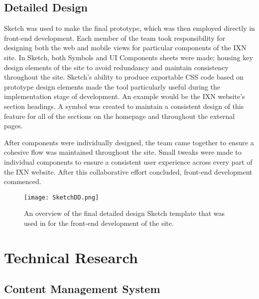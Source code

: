 \documentclass[fontsize=11pt]{extarticle}
\numberwithin{figure}{section} %
\numberwithin{table}{section}%
\begin{document}
\hypertarget{detailed-design}{%
\subsection{Detailed Design}\label{detailed-design}}

Sketch was used to make the final prototype, which was then employed
directly in front-end development. Each member of the team took
responsibility for designing both the web and mobile views for
particular components of the IXN site. In Sketch, both Symbols and UI
Components sheets were made; housing key design elements of the site to
avoid redundancy and maintain consistency throughout the site. Sketch's
ability to produce exportable CSS code based on prototype design
elements made the tool particularly useful during the implementation
stage of development. An example would be the IXN website's section
headings. A symbol was created to maintain a consistent design of this
feature for all of the sections on the homepage and throughout the
external pages.

After components were individually designed, the team came together to
ensure a cohesive flow was maintained throughout the site. Small tweaks
were made to individual components to ensure a consistent user
experience across every part of the IXN website. After this
collaborative effort concluded, front-end development commenced.

\begin{landscape}
\begin{figure}[H]
\centering
\texttt{[image: SketchDD.png]}
\caption{An overview of the final detailed design Sketch template that was used in for the front-end development of the site.}
\label{sketchdd}
\end{figure}
\end{landscape}

\newpage

\hypertarget{technical-research}{%
\section{Technical Research}\label{technical-research}}

\hypertarget{content-management-system}{%
\subsection{Content Management System}\label{content-management-system}}
\end{document}
